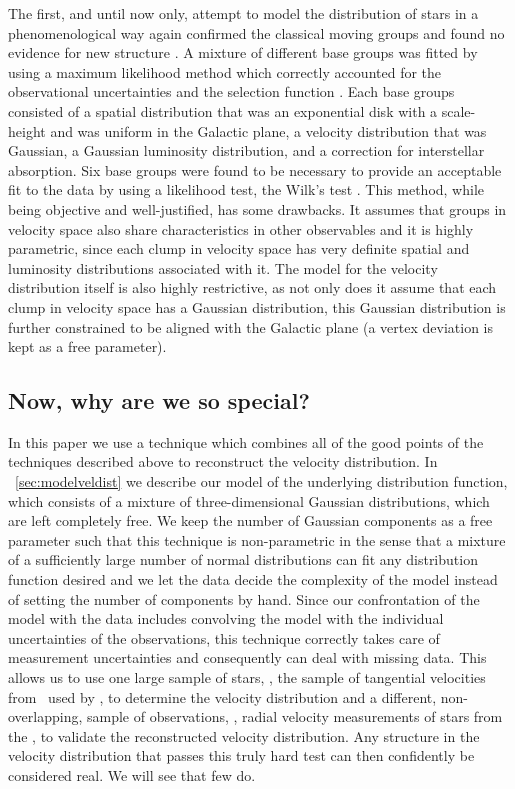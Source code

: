 The first, and until now only, attempt to model the distribution of
stars in a phenomenological way again confirmed the classical moving
groups and found no evidence for new structure
\citep{2005A&A...430..165F}. A mixture of different base groups was
fitted by using a maximum likelihood method which correctly accounted
for the observational uncertainties and the selection function
\citep{1996A&AS..117..405L}. Each base groups consisted of a spatial
distribution that was an exponential disk with a scale-height and was
uniform in the Galactic plane, a velocity distribution that was
Gaussian, a Gaussian luminosity distribution, and a correction for
interstellar absorption. Six base groups were found to be necessary to
provide an acceptable fit to the data by using a likelihood test, the
Wilk's test \citep{1990ebua.conf..407S}. This method, while being
objective and well-justified, has some drawbacks. It assumes that
groups in velocity space also share characteristics in other
observables and it is highly parametric, since each clump in velocity
space has very definite spatial and luminosity distributions
associated with it. The model for the velocity distribution itself is
also highly restrictive, as not only does it assume that each clump in
velocity space has a Gaussian distribution, this Gaussian distribution
is further constrained to be aligned with the Galactic plane (a vertex
deviation is kept as a free parameter).



\subsection{Now, why are we so special?}

In this paper we use a technique which combines all of the good points
of the techniques described above to reconstruct the velocity
distribution. In \sectionname\ \ref{sec:modelveldist} we describe our model
of the underlying distribution function, which consists of a mixture
of three-dimensional Gaussian distributions, which are left completely
free. We keep the number of Gaussian components as a free parameter
such that this technique is non-parametric in the sense that a mixture
of a sufficiently large number of normal distributions can fit any
distribution function desired and we let the data decide the
complexity of the model instead of setting the number of components by
hand. Since our confrontation of the model with the data includes
convolving the model with the individual uncertainties of the
observations, this technique correctly takes care of measurement
uncertainties and consequently can deal with missing data. This allows
us to use one large sample of stars, \ie, the sample of tangential
velocities from \Hipparcos\ used by \citet{1998AJ....115.2384D}, to
determine the velocity distribution and a different, non-overlapping,
sample of observations, \ie, radial velocity measurements of stars
from the \gcs, to validate the reconstructed velocity
distribution. Any structure in the velocity distribution that passes
this truly hard test can then confidently be considered real. We will
see that few do.



